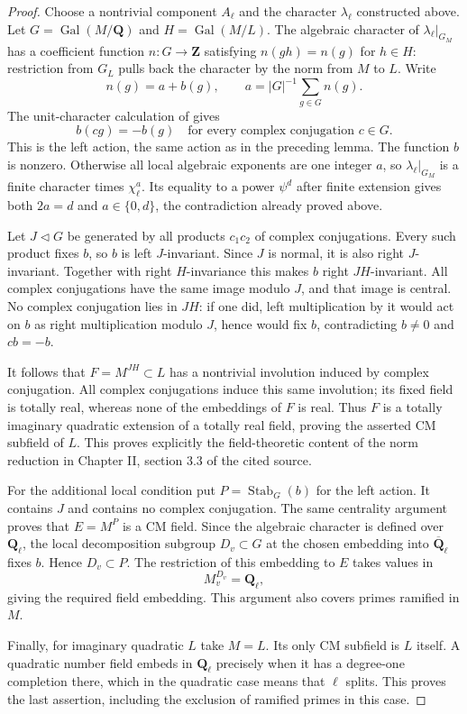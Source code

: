 \begin{proof}
Choose a nontrivial component $A_\ell$ and the
character $\lambda_\ell$ constructed above. Let
$G=\operatorname{Gal}(M/\mathbf Q)$ and
$H=\operatorname{Gal}(M/L)$. The algebraic character
of $\lambda_\ell|_{G_M}$ has a coefficient function
$n:G\to\mathbf Z$ satisfying $n(gh)=n(g)$ for
$h\in H$: restriction from $G_L$ pulls back the
character by the norm from $M$ to $L$. Write
\[
 n(g)=a+b(g),\qquad
 a=|G|^{-1}\sum_{g\in G}n(g).
\]
The unit-character calculation of
\cite[Chapter II, section 3.1, pp.~II--29--30]{A_SerreAbelian}
gives
\[
 b(cg)=-b(g)
 \quad\text{for every complex conjugation }c\in G.
\]
This is the left action, the same action as in the
preceding lemma. The function $b$ is nonzero.
Otherwise all local algebraic exponents are one
integer $a$, so $\lambda_\ell|_{G_M}$ is a finite
character times $\chi_\ell^a$. Its equality to a
power $\psi^d$ after finite extension gives both
$2a=d$ and $a\in\{0,d\}$, the contradiction already
proved above.

Let $J\lhd G$ be generated by all products $c_1c_2$
of complex conjugations. Every such product fixes
$b$, so $b$ is left $J$-invariant. Since $J$ is
normal, it is also right $J$-invariant. Together
with right $H$-invariance this makes $b$ right
$JH$-invariant. All complex conjugations have the
same image modulo $J$, and that image is central.
No complex conjugation lies in $JH$: if one did,
left multiplication by it would act on $b$ as
right multiplication modulo $J$, hence would fix
$b$, contradicting $b\ne0$ and $cb=-b$.

It follows that $F=M^{JH}\subset L$ has a
nontrivial involution induced by complex conjugation.
All complex conjugations induce this same involution;
its fixed field is totally real, whereas none of
the embeddings of $F$ is real. Thus $F$ is a
totally imaginary quadratic extension of a totally
real field, proving the asserted CM subfield of $L$.
This proves explicitly the field-theoretic content
of the norm reduction in Chapter II, section 3.3
of the cited source.

For the additional local condition put
$P=\operatorname{Stab}_G(b)$ for the left action.
It contains $J$ and contains no complex conjugation.
The same centrality argument proves that
$E=M^P$ is a CM field. Since the algebraic
character is defined over $\mathbf Q_\ell$, the
local decomposition subgroup $D_v\subset G$ at
the chosen embedding into $\overline{\mathbf Q}_\ell$
fixes $b$. Hence $D_v\subset P$. The restriction
of this embedding to $E$ takes values in
\[
                        M_v^{D_v}=\mathbf Q_\ell,
\]
giving the required field embedding. This argument
also covers primes ramified in $M$.

Finally, for imaginary quadratic $L$ take $M=L$.
Its only CM subfield is $L$ itself. A quadratic
number field embeds in $\mathbf Q_\ell$ precisely
when it has a degree-one completion there, which
in the quadratic case means that $\ell$ splits.
This proves the last assertion, including the
exclusion of ramified primes in this case.
\end{proof}

